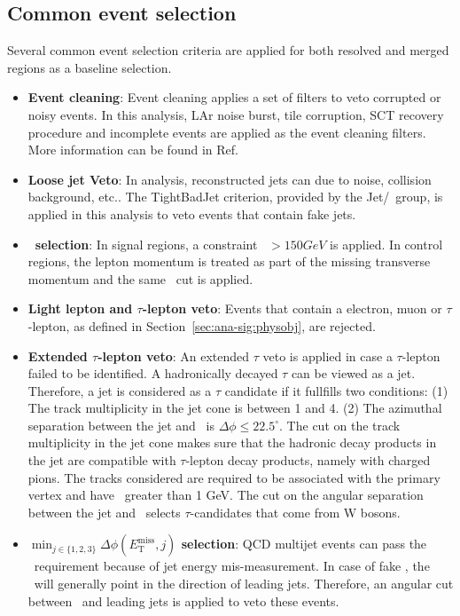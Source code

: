 \subsection{Common event selection}
\par Several common event selection criteria are applied for both resolved and merged regions as a baseline selection.
\begin{itemize}
    \item \textbf{Event cleaning}: Event cleaning applies a set of filters to veto corrupted or noisy events. In this analysis, LAr noise burst, tile corruption, SCT recovery procedure and incomplete events are applied as the event cleaning filters. More information can be found in Ref\cite{c8-evt-cleaning}.
    \item \textbf{Loose jet Veto}: In analysis, reconstructed jets can due to noise, collision background, etc.. The TightBadJet criterion, provided by the Jet/\met~group, is applied in this analysis to veto events that contain fake jets.
    \item \textbf{\met~selection}: In signal regions, a constraint \met~$>150GeV$ is applied. In control regions, the lepton momentum is treated as part of the missing transverse momentum and the same \met~cut is applied.
    \item \textbf{Light lepton and $\tau$-lepton veto}: Events that contain a electron, muon or $\tau$-lepton, as defined in Section~\ref{sec:ana-sig:physobj}, are rejected.
    \item \textbf{Extended $\tau$-lepton veto}: An extended $\tau$ veto is applied in case a $\tau$-lepton failed to be identified. A hadronically decayed $\tau$ can be viewed as a jet. Therefore, a jet is considered as a $\tau$ candidate if it fullfills two conditions: (1) The track multiplicity in the jet cone is between 1 and 4. (2) The azimuthal separation between the jet and \met~is $\Delta \phi \leq 22.5^\circ$. The cut on the track multiplicity in the jet cone makes sure that the hadronic decay products in the jet are compatible with $\tau$-lepton decay products, namely with charged pions. The tracks considered are required to be associated with the primary vertex and have \pt~greater than 1 GeV. The cut on the angular separation between the jet and \met~selects $\tau$-candidates that come from W bosons.
    \item \textbf{$\min_{j \in \{1,2,3\}}\Delta\phi(E_{\mathrm{T}}^{\mathrm{miss}},j)$ selection}: QCD multijet events can pass the \met~requirement because of jet energy mis-measurement. In case of fake \met, the \met~will generally point in the direction of leading jets. Therefore, an angular cut between \met~and leading jets is applied to veto these events.
\end{itemize}

